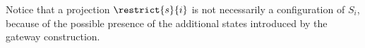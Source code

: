%
%


 Notice that a projection $\restrict{s}{i}$ is not necessarily a configuration of $S_i$, because of the possible presence of the additional states introduced by the gateway construction.
 
